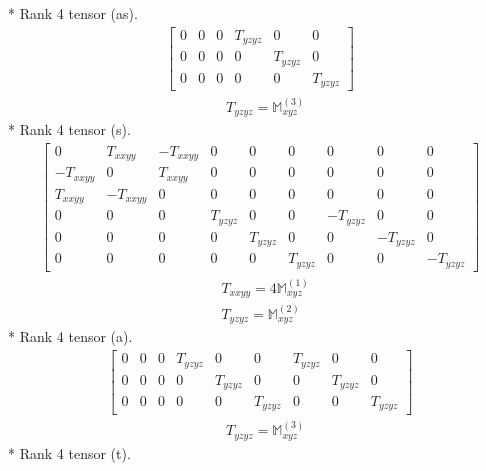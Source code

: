\documentclass[fleqn,8pt,landscape]{jsarticle}
\begin{document}
* Rank 4 tensor (as).
\begin{align*}
\begin{bmatrix} 0 & 0 & 0 & T_{yzyz} & 0 & 0 \\ 0 & 0 & 0 & 0 & T_{yzyz} & 0 \\ 0 & 0 & 0 & 0 & 0 & T_{yzyz} \end{bmatrix}
\end{align*}
\begin{align*}
& T_{yzyz} = \mathbb{M}_{xyz}^{(3)}
\end{align*}
* Rank 4 tensor (s).
\begin{align*}
\begin{bmatrix} 0 & T_{xxyy} & - T_{xxyy} & 0 & 0 & 0 & 0 & 0 & 0 \\ - T_{xxyy} & 0 & T_{xxyy} & 0 & 0 & 0 & 0 & 0 & 0 \\ T_{xxyy} & - T_{xxyy} & 0 & 0 & 0 & 0 & 0 & 0 & 0 \\ 0 & 0 & 0 & T_{yzyz} & 0 & 0 & - T_{yzyz} & 0 & 0 \\ 0 & 0 & 0 & 0 & T_{yzyz} & 0 & 0 & - T_{yzyz} & 0 \\ 0 & 0 & 0 & 0 & 0 & T_{yzyz} & 0 & 0 & - T_{yzyz} \end{bmatrix}
\end{align*}
\begin{align*}
& T_{xxyy} = 4 \mathbb{M}_{xyz}^{(1)} \\
& T_{yzyz} = \mathbb{M}_{xyz}^{(2)}
\end{align*}
* Rank 4 tensor (a).
\begin{align*}
\begin{bmatrix} 0 & 0 & 0 & T_{yzyz} & 0 & 0 & T_{yzyz} & 0 & 0 \\ 0 & 0 & 0 & 0 & T_{yzyz} & 0 & 0 & T_{yzyz} & 0 \\ 0 & 0 & 0 & 0 & 0 & T_{yzyz} & 0 & 0 & T_{yzyz} \end{bmatrix}
\end{align*}
\begin{align*}
& T_{yzyz} = \mathbb{M}_{xyz}^{(3)}
\end{align*}
* Rank 4 tensor (t).
\end{document}
